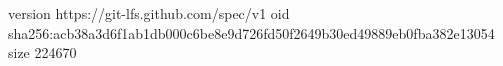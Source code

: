 version https://git-lfs.github.com/spec/v1
oid sha256:acb38a3d6f1ab1db000c6be8e9d726fd50f2649b30ed49889eb0fba382e13054
size 224670
